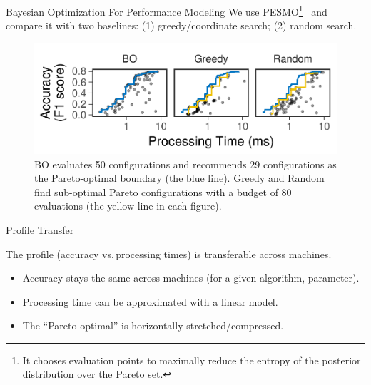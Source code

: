 \begin{frame}{Bayesian Optimization For Performance Modeling}
  \vspace{1em} We use PESMO\footnote{It chooses evaluation points to maximally
    reduce the entropy of the posterior distribution over the Pareto
    set.}~\cite{hernandez2016predictive} and compare it with two baselines: (1)
  greedy/coordinate search; (2) random search.

  \pause
  \begin{figure}
    \centering
    \includegraphics[width=0.95\linewidth]{figures/serving-eval-bo.pdf}
    \caption{BO evaluates 50 configurations and recommends 29 configurations as
      the Pareto-optimal boundary (the blue line). Greedy and Random find
      sub-optimal Pareto configurations with a budget of 80 evaluations (the
      yellow line in each figure).}
  \end{figure}
\end{frame}

\begin{frame}{Profile Transfer}
  \vspace{1em}

  The profile (accuracy vs.\,processing times) is transferable across machines.
  \begin{itemize}
  \item Accuracy stays the same across machines (for a given algorithm,
    parameter).
  \item Processing time can be approximated with a linear model.
  \item The ``Pareto-optimal'' is horizontally stretched/compressed.
  \end{itemize}

\end{frame}

